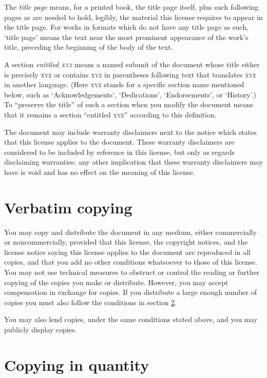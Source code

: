 \begin{multicols}{3}
The \emph{title page} means, for a printed book, the title page itself, plus such following pages as are needed to hold, legibly, the material this license requires to appear in the title page. For works in formats which do not have any title page as such, \enquote*{title page} means the text near the most prominent appearance of the work's title, preceding the beginning of the body of the text.

A section \emph{entitled \textsc{xyz}} means a named subunit of the document whose title either is precisely \textsc{xyz} or contains \textsc{xyz} in parentheses following text that translates \textsc{xyz} in another language. (Here \textsc{xyz} stands for a specific section name mentioned below, such as \enquote*{Acknowledgements}, \enquote*{Dedications}, \enquote*{Endorsements}, or \enquote*{History}.) To \enquote{preserve the title} of such a section when you modify the document means that it remains a section \enquote{entitled \textsc{xyz}} according to this definition.

The document may include warranty disclaimers next to the notice which states that this license applies to the document. These warranty disclaimers are considered to be included by reference in this license, but only as regards disclaiming warranties: any other implication that these warranty disclaimers may have is void and has no effect on the meaning of this license.

\section{Verbatim copying}
\label{fdl:verbcopy}

You may copy and distribute the document in any medium, either commercially or noncommercially, provided that this license, the copyright notices, and the license notice saying this license applies to the document are reproduced in all copies, and that you add no other conditions whatsoever to those of this license. You may not use technical measures to obstruct or control the reading or further copying of the copies you make or distribute. However, you may accept compensation in exchange for copies. If you distribute a large enough number of copies you must also follow the conditions in section \ref{fdl:masscopy}.

You may also lend copies, under the same conditions stated above, and you may publicly display copies.

\section{Copying in quantity}
\label{fdl:masscopy}


\end{multicols}
